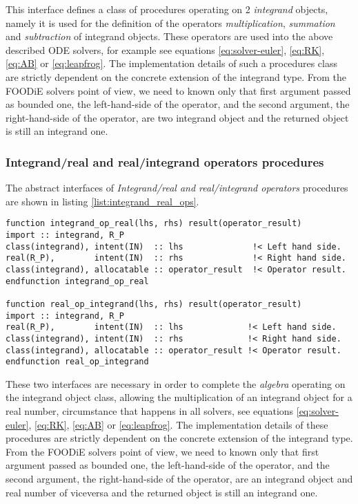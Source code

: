 \documentclass[pdftex,preprint,3p,times,numbers]{elsarticle}
\begin{document}
This interface defines a class of procedures operating on 2 \emph{integrand} objects, namely it is used for the definition of the operators \emph{multiplication}, \emph{summation} and \emph{subtraction} of integrand objects. These operators are used into the above described ODE solvers, for example see equations \ref{eq:solver-euler}, \ref{eq:RK}, \ref{eq:AB} or \ref{eq:leapfrog}. The implementation details of such a procedures class are strictly dependent on the concrete extension of the integrand type. From the FOODiE solvers point of view, we need to known only that first argument passed as bounded one, the left-hand-side of the operator, and the second argument, the right-hand-side of the operator, are two integrand object and the returned object is still an integrand one.

\subsubsection{Integrand/real and real/integrand operators procedures}

The abstract interfaces of \emph{Integrand/real and real/integrand operators} procedures are shown in listing \ref{list:integrand_real_ops}.

\begin{lstlisting}[firstnumber=1,style=code,caption={Integrand/real and real/integrand operators procedure interfaces},label={list:integrand_real_ops}]
function integrand_op_real(lhs, rhs) result(operator_result)
import :: integrand, R_P
class(integrand), intent(IN)  :: lhs              !< Left hand side.
real(R_P),        intent(IN)  :: rhs              !< Right hand side.
class(integrand), allocatable :: operator_result  !< Operator result.
endfunction integrand_op_real

function real_op_integrand(lhs, rhs) result(operator_result)
import :: integrand, R_P
real(R_P),        intent(IN)  :: lhs             !< Left hand side.
class(integrand), intent(IN)  :: rhs             !< Right hand side.
class(integrand), allocatable :: operator_result !< Operator result.
endfunction real_op_integrand
\end{lstlisting}

These two interfaces are necessary in order to complete the \emph{algebra} operating on the integrand object class, allowing the multiplication of an integrand object for a real number, circumstance that happens in all solvers, see equations \ref{eq:solver-euler}, \ref{eq:RK}, \ref{eq:AB} or \ref{eq:leapfrog}. The implementation details of these procedures are strictly dependent on the concrete extension of the integrand type. From the FOODiE solvers point of view, we need to known only that first argument passed as bounded one, the left-hand-side of the operator, and the second argument, the right-hand-side of the operator, are an integrand object and real number of viceversa and the returned object is still an integrand one.
\end{document}
